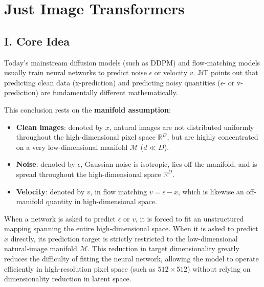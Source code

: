 \setcounter{section}{5}

\hypertarget{just-image-transformers}{%
\section{Just Image Transformers}\label{just-image-transformers}}

\hypertarget{i.-core-idea-7}{%
\subsection{I. Core Idea}\label{i.-core-idea-7}}

Today's mainstream diffusion models (such as DDPM) and flow-matching models usually train neural networks to predict noise \(\epsilon\) or velocity \(v\). JiT points out that predicting clean data (x-prediction) and predicting noisy quantities (\(\epsilon\)- or v-prediction) are fundamentally different mathematically.

This conclusion rests on the \textbf{manifold assumption}:

\begin{itemize}
\tightlist
\item
  \textbf{Clean images}: denoted by \(x\), natural images are not distributed uniformly throughout the high-dimensional pixel space \(\mathbb{R}^D\), but are highly concentrated on a very low-dimensional manifold \(\mathcal{M}\) (\(d\ll D\)).
\item
  \textbf{Noise}: denoted by \(\epsilon\), Gaussian noise is isotropic, lies off the manifold, and is spread throughout the high-dimensional space \(\mathbb{R}^D\).
\item
  \textbf{Velocity}: denoted by \(v\), in flow matching \(v=\epsilon-x\), which is likewise an off-manifold quantity in high-dimensional space.
\end{itemize}

When a network is asked to predict \(\epsilon\) or \(v\), it is forced to fit an unstructured mapping spanning the entire high-dimensional space. When it is asked to predict \(x\) directly, its prediction target is strictly restricted to the low-dimensional natural-image manifold \(\mathcal{M}\). This reduction in target dimensionality greatly reduces the difficulty of fitting the neural network, allowing the model to operate efficiently in high-resolution pixel space (such as \(512\times512\)) without relying on dimensionality reduction in latent space.

